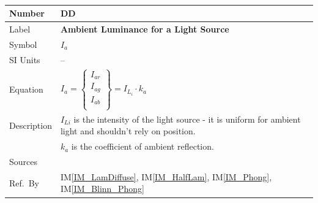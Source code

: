\documentclass[12pt]{article}
\newcommand{\colAwidth}{0.13\textwidth}
\newcommand{\colBwidth}{0.82\textwidth}
\newcounter{defnum} %
\newcounter{datadefnum} %
\newcommand{\iref}[1]{IM\ref{#1}}
\begin{document}
~\newline

\noindent
\begin{minipage}{\textwidth}
	\renewcommand*{\arraystretch}{1.5}
	\begin{tabular}{| p{\colAwidth} | p{\colBwidth}|}
		\hline
		\rowcolor[gray]{0.9}
		Number& DD{datadefnum}\thedatadefnum 
		\label{DD_Intensity_ambient}\\
		\hline
		Label& \bf Ambient Luminance for a Light Source\\
		\hline
		Symbol &$I_{a}$\\
		\hline
		SI Units & --\\
		\hline
		Equation&$I_{a} = \begin{Bmatrix}
		I_{ar} \\ I_{ag} \\ I_{ab} \\
		\end{Bmatrix} = I_{L_{i}}\cdot k_{a}$\\
		\hline
		Description & $I_{L{i}}$ is the intensity of the light source - it is 
		uniform for ambient light and shouldn't rely on position. \\
		& $k_{a}$ is the coefficient of ambient reflection.\\
		\hline
		Sources& \cite{shreiner2012}\\
		\hline
		Ref.\ By & \iref{IM_LamDiffuse}, \iref{IM_HalfLam}, \iref{IM_Phong}, 
		\iref{IM_Blinn_Phong}\\
		\hline
	\end{tabular}
\end{minipage}\\


~\newline
\end{document}
